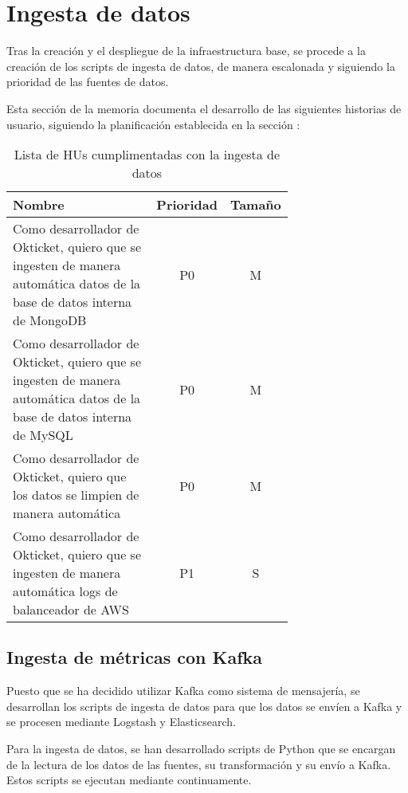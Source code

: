 \section{Ingesta de datos}\label{sec:impl_ingesta}
Tras la creación y el despliegue de la infraestructura base, se procede a la
creación de los scripts de ingesta de datos, de manera escalonada y siguiendo
la prioridad de las fuentes de datos.

Esta sección de la memoria documenta el desarrollo de las siguientes historias
de usuario, siguiendo la planificación establecida en la sección :

\begin{table}[H]
	\centering
	\begin{tabular}{|p{0.7\linewidth}|c|c|}
		\hline
		\textbf{Nombre} & \textbf{Prioridad} & \textbf{Tamaño} \\
		\hline
		\hline
		Como desarrollador de Okticket, quiero que se ingesten de manera automática datos de la base de datos interna de MongoDB & P0\cellcolor{red!50} & M\cellcolor{yellow!50} \\
		\hline
		Como desarrollador de Okticket, quiero que se ingesten de manera automática datos de la base de datos interna de MySQL & P0\cellcolor{red!50} & M\cellcolor{yellow!50} \\
		\hline
		Como desarrollador de Okticket, quiero que los datos se limpien de manera automática & P0\cellcolor{red!50} & M\cellcolor{yellow!50} \\
		\hline
		Como desarrollador de Okticket, quiero que se ingesten de manera automática logs de balanceador de AWS & P1\cellcolor{orange!50} & S\cellcolor{green!25} \\
		\hline
  \end{tabular}
  \caption{Lista de HUs cumplimentadas con la ingesta de datos}
  \label{tab:impl_ingesta}
\end{table}


\newpage{}
\subsection{Ingesta de métricas con Kafka}\label{subsec:impl_ingesta_kafka}
Puesto que se ha decidido utilizar Kafka como sistema de mensajería, se
desarrollan los scripts de ingesta de datos para que los datos se envíen a
Kafka y se procesen mediante Logstash y Elasticsearch.

Para la ingesta de datos, se han desarrollado scripts de Python que se encargan
de la lectura de los datos de las fuentes, su transformación y su envío a Kafka.
Estos scripts se ejecutan mediante continuamente.

